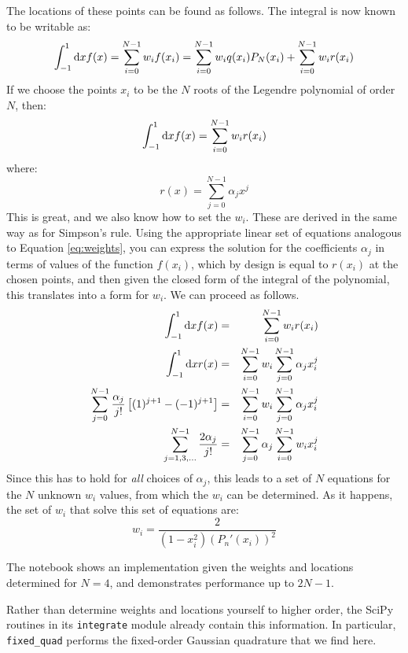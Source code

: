 The locations of these points can be found as follows. The integral is
now known to be writable as:
\begin{equation}
\int_{-1}^{1} {\rm d}x f(x) = \sum_{i=0}^{N-1} w_i f(x_i) =
\sum_{i=0}^{N-1} w_i q(x_i) P_N(x_i) + 
\sum_{i=0}^{N-1} w_i r(x_i)
\end{equation}
If we choose the points $x_i$ to be the $N$ roots of the Legendre
polynomial of order $N$, then:
\begin{equation}
\int_{-1}^{1} {\rm d}x f(x) = \sum_{i=0}^{N-1} w_i r(x_i)
\end{equation}
where:
\begin{equation}
r(x) = \sum_{j=0}^{N-1} \alpha_j x^j
\end{equation}
This is great, and we also know how to set the $w_i$. These are
derived in the same way as for Simpson's rule.
Using the appropriate
linear set of equations analogous to Equation \ref{eq:weights}, you
can express the solution for the coefficients $\alpha_j$ in terms of
values of the function $f(x_i)$, which by design is equal to $r(x_i)$
at the chosen points, and then given the closed form of the integral 
of the polynomial, this translates into a form for $w_i$. We can
proceed as follows.
\begin{eqnarray}
\int_{-1}^{1} {\rm d}x f(x) &=& \sum_{i=0}^{N-1} w_i r(x_i)\cr
\int_{-1}^{1} {\rm d}x r(x) &=& \sum_{i=0}^{N-1} w_i
\sum_{j=0}^{N-1} \alpha_{j} x_i^{j}\cr
\sum_{j=0}^{N-1} \frac{\alpha_j}{j!} \left[(1)^{j+1} -
(-1)^{j+1}\right] &=& \sum_{i=0}^{N-1} w_i 
\sum_{j=0}^{N-1} \alpha_{j} x_i^{j}\cr
\sum_{j=1,3,\ldots}^{N-1} \frac{2 \alpha_j}{j!} &=&
\sum_{{j}=0}^{N-1}
\alpha_{j}
\sum_{i=0}^{N-1} w_i 
x_i^{j}
\end{eqnarray}
Since this has to hold for {\it all} choices of $\alpha_j$, this leads
to a set of $N$ equations for the $N$ unknown $w_i$ values, from which
the $w_i$ can be determined. As it happens, the set of $w_i$ that
solve this set of equations are:
\begin{equation}
w_i = \frac{2}{\left(1-x_i^2\right) \left(P_n'(x_i)\right)^2}
\end{equation}

The notebook shows an implementation given the weights and locations
determined for $N=4$, and demonstrates performance up to $2N-1$.

Rather than determine weights and locations yourself to higher order,
the SciPy routines in its {\tt integrate} module already contain this
information. In particular, {\tt fixed\_quad} performs the fixed-order
Gaussian quadrature that we find here.

